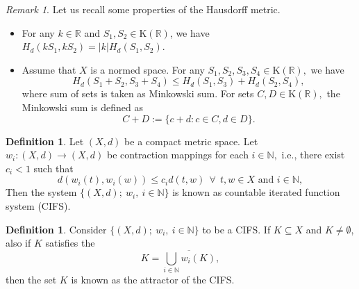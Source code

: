 \documentclass[12pt,oneside,reqno]{amsart}
\theoremstyle{definition}
\newtheorem{definition}[theorem]{Definition}
\theoremstyle{remark}
\newtheorem{remark}[theorem]{Remark}
\begin{document}
 \begin{remark}
\cite[Proposition $1.17$]{Hu1997handbook}\label{new71}
   Let us recall some properties of the Hausdorff metric.
\begin{itemize}
  \item For any $k \in \mathbb{R}$ and $S_1,S_2 \in  \mathrm{K} (\mathbb{R})$, we have $H_d (k S_1,k S_2)=  \lvert k\rvert   H_d (S_1,S_2).$
  \item Assume that $X$ is a normed space. For any $S_1, S_2, S_3, S_4 \in  \mathrm{K} (\mathbb{R}),$ we have
   \[H_d (S_1 + S_2, S_3 + S_4) \le  H_d (S_1,S_3) + H_d (S_2, S_4),\]
   where sum of sets is taken as Minkowski sum. For sets $C,D \in \mathrm{K} (\mathbb{R}),$ the Minkowski sum  is defined as  \[ C+D := \{c + d : c \in  C  , d \in D\}. \]
\end{itemize}
\end{remark}
 
\begin{definition}\cite{Hut}\label{Iterated}
Let $(X,d)$ be a compact metric space. Let $w_i:(X,d)\to (X,d)$ be contraction mappings for each $i\in \mathbb{N},$ i.e., there exist $c_i <1$ such that \[ d(w_i(t),w_i(w))\le c_id(t,w) ~~\forall~~ t,w \in X  \text{ and } i \in \mathbb{N},\] Then the system $\{(X,d);~w_i,~i\in \mathbb{N}\} $ is known as countable iterated function system (CIFS).
\end{definition}
\begin{definition}
    Consider $\{(X,d);~w_i,~i\in \mathbb{N}\} $ to be a CIFS. If $K \subseteq X$ and $K\neq \emptyset$, also if $K$ satisfies the \[ K= \overline{\underset{i\in\mathbb{N}}{\bigcup}w_i(K)},\] then the set $K$ is known as the attractor of the CIFS.
\end{definition}
 
\end{document}
